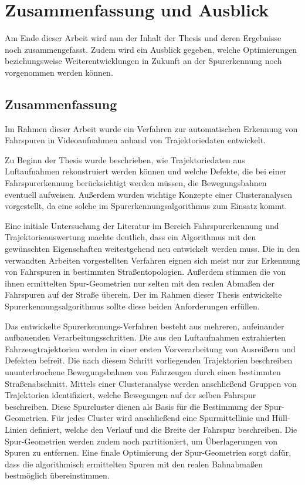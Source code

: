 
\chapter{Zusammenfassung und Ausblick}
\label{cha:end}

Am Ende dieser Arbeit wird nun der Inhalt der Thesis und deren Ergebnisse noch
zusammengefasst. Zudem wird ein Ausblick gegeben, welche Optimierungen beziehungsweise
Weiterentwicklungen in Zukunft an der Spurerkennung noch vorgenommen werden können.

\section{Zusammenfassung}

Im Rahmen dieser Arbeit wurde ein Verfahren zur automatischen Erkennung von Fahrspuren in Videoaufnahmen
anhand von Trajektoriedaten entwickelt.

Zu Beginn der Thesis wurde beschrieben, wie Trajektoriedaten aus Luftaufnahmen rekonstruiert werden können
und welche Defekte, die bei einer Fahrspurerkennung berücksichtigt werden müssen, die Bewegungsbahnen eventuell aufweisen.
Außerdem wurden wichtige Konzepte einer Clusteranalysen vorgestellt, da eine solche im Spurerkennungsalgorithmus
zum Einsatz kommt.

Eine initiale Untersuchung der Literatur im Bereich Fahrspurerkennung und Trajektorieauswertung
machte deutlich, dass ein Algorithmus mit den gewünschten Eigenschaften weitestgehend neu entwickelt werden muss.
Die in den verwandten Arbeiten vorgestellten Verfahren eignen sich meist nur zur Erkennung von Fahrspuren
in bestimmten Straßentopologien. Außerdem stimmen die von ihnen ermittelten Spur-Geometrien nur selten
mit den realen Abmaßen der Fahrspuren auf der Straße überein.
Der im Rahmen dieser Thesis entwickelte Spurerkennungsalgorithmus sollte diese beiden Anforderungen erfüllen.

Das entwickelte Spurerkennungs-Verfahren besteht aus mehreren, aufeinander aufbauenden Verarbeitungsschritten. Die aus den
Luftaufnahmen extrahierten Fahrzeugtrajektorien werden in einer ersten Vorverarbeitung von
Ausreißern und Defekten befreit. Die nach diesem Schritt vorliegenden Trajektorien beschreiben
ununterbrochene Bewegungsbahnen von Fahrzeugen durch einen bestimmten Straßenabschnitt.
Mittels einer Clusteranalyse werden anschließend Gruppen von Trajektorien identifiziert, welche Bewegungen
auf der selben Fahrspur beschreiben.
Diese Spurcluster dienen als Basis für die Bestimmung der Spur-Geometrien. Für jedes Cluster wird anschließend eine
Spurmittellinie und Hüll-Linien definiert, welche den Verlauf und die Breite der Fahrspur beschreiben.
Die Spur-Geometrien werden zudem noch partitioniert, um Überlagerungen von Spuren zu entfernen.
Eine finale Optimierung der Spur-Geometrien sorgt dafür, dass die algorithmisch ermittelten Spuren
mit den realen Bahnabmaßen bestmöglich übereinstimmen. 

